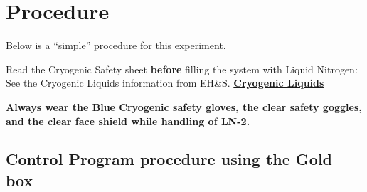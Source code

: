 \documentclass{../lab}
\begin{document}
\section{Procedure}

Below is a ``simple'' procedure for this experiment.

Read the Cryogenic Safety sheet \textbf{before} filling the system with Liquid Nitrogen: See the Cryogenic Liquids information from EH\&S. \href{http://experimentationlab.berkeley.edu/sites/default/files/images/77cryogenic.pdf}{\textbf{Cryogenic Liquids}}

\textbf{Always wear the Blue Cryogenic safety gloves, the clear safety goggles, and the clear face shield while handling of LN-2.}

\subsection{Control Program procedure using the Gold box}
\end{document}
